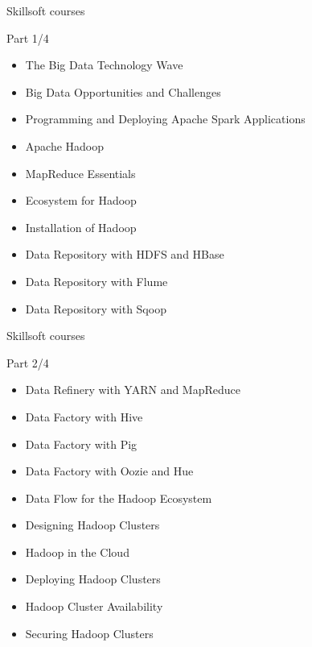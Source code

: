 \begin{frame}{Skillsoft courses}
  \begin{block}{Part 1/4}
    \begin{itemize}
      \item The Big Data Technology Wave	
      \item	Big Data Opportunities and Challenges	
      \item	Programming and Deploying Apache Spark Applications	
      \item	Apache Hadoop	
      \item	MapReduce Essentials 
      \item	Ecosystem for Hadoop
      \item	Installation of Hadoop
      \item	Data Repository with HDFS and HBase
      \item	Data Repository with Flume
      \item	Data Repository with Sqoop
    \end{itemize}
  \end{block}
\end{frame}

\begin{frame}{Skillsoft courses}
  \begin{block}{Part 2/4}
    \begin{itemize}
      \item	Data Refinery with YARN and MapReduce	
      \item	Data Factory with Hive
      \item	Data Factory with Pig	
      \item	Data Factory with Oozie and Hue	
      \item	Data Flow for the Hadoop Ecosystem	
      \item	Designing Hadoop Clusters	
      \item	Hadoop in the Cloud	
      \item	Deploying Hadoop Clusters	
      \item	Hadoop Cluster Availability	
      \item	Securing Hadoop Clusters
    \end{itemize}
  \end{block}
\end{frame}

